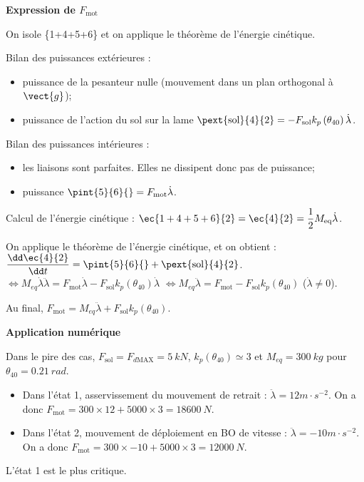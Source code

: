 \documentclass[11pt]{article}
\begin{document}
\begin{UPSTIcorrige}

\textbf{Expression de $F_{\text{mot}}$}

On isole  \{1+4+5+6\} et on applique le théorème de l'énergie cinétique. 

Bilan des puissances extérieures : 
\begin{itemize}
\item puissance de la pesanteur nulle (mouvement dans un plan orthogonal à $\vect{g}$);
\item puissance de l'action du sol sur la lame 
$\pext{\text{sol}}{4}{2}=-F_{\text{sol}}k_p\left(\theta_{40}\right)\dot{\lambda}$.
\end{itemize}

Bilan des puissances intérieures :
\begin{itemize}
\item les liaisons sont parfaites. Elles ne dissipent donc pas de puissance;
\item puissance $\pint{5}{6}{}=F_{\text{mot}}\dot{\lambda}$.
\end{itemize}




Calcul de l'énergie cinétique : $\ec{1+4+5+6}{2} =\ec{4}{2} = \dfrac{1}{2}M_{\text{eq}}\dot{\lambda}$.

On applique le théorème de l'énergie cinétique, et on obtient : 
$\dfrac{\dd \ec{4}{2}}{\dd t}= \pint{5}{6}{}+\pext{\text{sol}}{4}{2}$.
$\Leftrightarrow 
M_{eq} \dot{\lambda}\ddot{\lambda}=  F_{\text{mot}}\dot{\lambda}
-F_{\text{sol}}k_p\left(\theta_{40}\right)\dot{\lambda}$
$\Leftrightarrow 
M_{eq} \ddot{\lambda}=  F_{\text{mot}}
-F_{\text{sol}}k_p\left(\theta_{40}\right)$ ($\dot{\lambda}\neq 0$).

 Au final,   $F_{\text{mot}}=M_{eq} \ddot{\lambda} + F_{\text{sol}}k_p\left(\theta_{40}\right)$.

\textbf{Application numérique}



Dans le pire des cas, $F_{\text{sol}} = F_{d \text{MAX}}=\SI{5}{kN}$, $k_p\left(\theta_{40}\right) \simeq 3$ et $M_{eq}=\SI{300}{kg}$ pour $\theta_{40}=\SI{0,21}{rad}$.

\begin{itemize}
\item Dans l'état 1, asservissement du mouvement de retrait : $\ddot{\lambda}=12 m\cdot s^{-2}$. On a donc  $F_{\text{mot}}=300 \times  12 + 5000\times 3 = \SI{18 600}{N}$.
\item Dans l'état 2, mouvement de déploiement en BO de vitesse : $\ddot{\lambda}=-10 m\cdot s^{-2}$. On a donc  $F_{\text{mot}}=300 \times  -10 + 5000\times 3 = \SI{12 000}{N}$.
\end{itemize}

L'état 1 est le plus critique.


\end{UPSTIcorrige}
\end{document}

